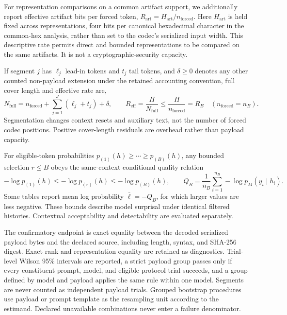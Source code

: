 \documentclass[fleqn,10pt]{wlscirep}
\begin{document}
For representation comparisons on a common artifact support, we additionally report effective artifact bits per forced token, \(R_{\mathrm{art}}=H_{\mathrm{art}}/n_{\mathrm{forced}}\). Here \(H_{\mathrm{art}}\) is held fixed across representations, four bits per canonical hexadecimal character in the common-hex analysis, rather than set to the codec's serialized input width. This descriptive rate permits direct and bounded representations to be compared on the same artifacts. It is not a cryptographic-security capacity.

If segment \(j\) has \(\ell_j\) lead-in tokens and \(t_j\) tail tokens, and \(\delta\ge0\) denotes any other counted non-payload extension under the retained accounting convention, full cover length and effective rate are,
\begin{equation}
N_{\mathrm{full}}
=n_{\mathrm{forced}}+\sum_{j=1}^{J}(\ell_j+t_j)+\delta,
\qquad
R_{\mathrm{eff}}=\frac{H}{N_{\mathrm{full}}}
\le\frac{H}{n_{\mathrm{forced}}}=R_B
\quad(n_{\mathrm{forced}}=n_B).
\label{eq:effective-rate}
\end{equation}
Segmentation changes context resets and auxiliary text, not the number of forced codec positions. Positive cover-length residuals are overhead rather than payload capacity.

For eligible-token probabilities \(p_{(1)}(h)\ge\cdots\ge p_{(B)}(h)\), any bounded selection \(r\le B\) obeys the same-context conditional quality relation
\begin{equation}
-\log p_{(1)}(h)
\le-\log p_{(r)}(h)
\le-\log p_{(B)}(h),\qquad
Q_B=\frac{1}{n_B}\sum_{i=1}^{n_B}-\log p_M(y_i\mid h_i).
\label{eq:quality-bound}
\end{equation}
Some tables report mean log probability \(\bar\ell=-Q_B\), for which larger values are less negative. These bounds describe model surprisal under identical filtered histories. Contextual acceptability and detectability are evaluated separately.

The confirmatory endpoint is exact equality between the decoded serialized payload bytes and the declared source, including length, syntax, and SHA-256 digest. Exact rank and representation equality are retained as diagnostics. Trial-level Wilson 95\% intervals are reported\cite{Wilson1927Interval}, a strict payload group passes only if every constituent prompt, model, and eligible protocol trial succeeds, and a group defined by model and payload applies the same rule within one model. Segments are never counted as independent payload trials. Grouped bootstrap procedures use payload or prompt template as the resampling unit according to the estimand. Declared unavailable combinations never enter a failure denominator.
\end{document}
